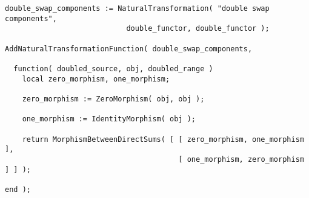 \begin{small}
\begin{Verbatim}[frame=single]
double_swap_components := NaturalTransformation( "double swap components", 
                            double_functor, double_functor );

AddNaturalTransformationFunction( double_swap_components,
  
  function( doubled_source, obj, doubled_range )
    local zero_morphism, one_morphism;
    
    zero_morphism := ZeroMorphism( obj, obj );
    
    one_morphism := IdentityMorphism( obj );
    
    return MorphismBetweenDirectSums( [ [ zero_morphism, one_morphism ],
                                        [ one_morphism, zero_morphism ] ] );
    
end );
\end{Verbatim}
\end{small}